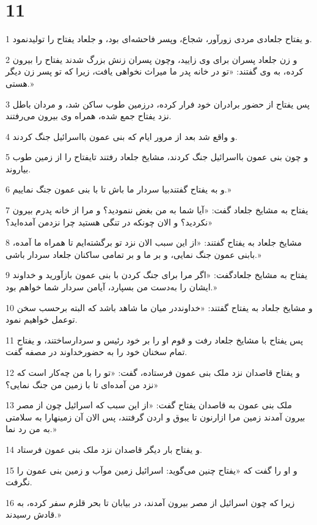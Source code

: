 \chapter{11}

\par 1 و یفتاح جلعادی مردی زورآور، شجاع، وپسر فاحشه‌ای بود، و جلعاد یفتاح را تولیدنمود.
\par 2 و زن جلعاد پسران برای وی زایید، وچون پسران زنش بزرگ شدند یفتاح را بیرون کرده، به وی گفتند: «تو در خانه پدر ما میراث نخواهی یافت، زیرا که تو پسر زن دیگر هستی.»
\par 3 پس یفتاح از حضور برادران خود فرار کرده، درزمین طوب ساکن شد، و مردان باطل نزد یفتاح جمع شده، همراه وی بیرون می‌رفتند.
\par 4 و واقع شد بعد از مرور ایام که بنی عمون بااسرائیل جنگ کردند.
\par 5 و چون بنی عمون بااسرائیل جنگ کردند، مشایخ جلعاد رفتند تایفتاح را از زمین طوب بیاروند.
\par 6 و به یفتاح گفتندبیا سردار ما باش تا با بنی عمون جنگ نماییم.»
\par 7 یفتاح به مشایخ جلعاد گفت: «آیا شما به من بغض ننمودید؟ و مرا از خانه پدرم بیرون نکردید؟ و الان چونکه در تنگی هستید چرا نزدمن آمده‌اید؟»
\par 8 مشایخ جلعاد به یفتاح گفتند: «از این سبب الان نزد تو برگشته‌ایم تا همراه ما آمده، بابنی عمون جنگ نمایی، و بر ما و بر تمامی ساکنان جلعاد سردار باشی.»
\par 9 یفتاح به مشایخ جلعادگفت: «اگر مرا برای جنگ کردن با بنی عمون بازآورید و خداوند ایشان را به‌دست من بسپارد، آیامن سردار شما خواهم بود.»
\par 10 و مشایخ جلعاد به یفتاح گفتند: «خداونددر میان ما شاهد باشد که البته برحسب سخن توعمل خواهیم نمود.
\par 11 پس یفتاح با مشایخ جلعاد رفت و قوم او را بر خود رئیس و سردارساختند، و یفتاح تمام سخنان خود را به حضورخداوند در مصفه گفت.
\par 12 و یفتاح قاصدان نزد ملک بنی عمون فرستاده، گفت: «تو را با من چه‌کار است که نزد من آمده‌ای تا با زمین من جنگ نمایی؟»
\par 13 ملک بنی عمون به قاصدان یفتاح گفت: «از این سبب که اسرائیل چون از مصر بیرون آمدند زمین مرا ازارنون تا یبوق و اردن گرفتند، پس الان آن زمینهارا به سلامتی به من رد نما.»
\par 14 و یفتاح بار دیگر قاصدان نزد ملک بنی عمون فرستاد.
\par 15 و او را گفت که «یفتاح چنین می‌گوید: اسرائیل زمین موآب و زمین بنی عمون را نگرفت.
\par 16 زیرا که چون اسرائیل از مصر بیرون آمدند، در بیابان تا بحر قلزم سفر کرده، به قادش رسیدند.»
